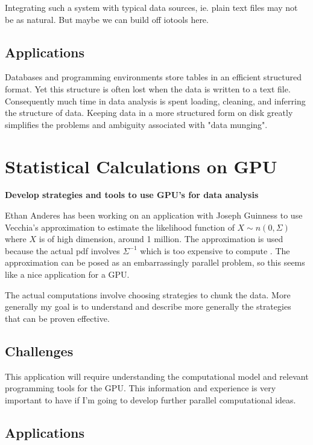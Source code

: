 \documentclass[12pt]{article}
\begin{document}
Integrating such a system with typical data sources, ie. plain text files may
not be as natural. But maybe we can build off iotools here.

\subsection{Applications}

Databases and programming environments store tables in an efficient
structured format. Yet this structure is often lost when the data is
written to a text file. Consequently much time in data analysis is
spent loading, cleaning, and inferring the structure of data. Keeping data
in a more structured form on disk greatly simplifies the problems and
ambiguity associated with "data munging".


\section{Statistical Calculations on GPU}

\textbf{Develop strategies and tools to use GPU's for data analysis}

Ethan Anderes has been working on an application with Joseph Guinness to
use Vecchia's approximation to estimate the likelihood function of $X \sim
n(0, \Sigma)$ where $X$ is of high dimension, around 1 million. The
approximation is used because the actual pdf involves $\Sigma^{-1}$ which
is too expensive to compute \cite{guinness2016permutation}.  The
approximation can be posed as an embarrassingly parallel problem, so this
seems like a nice application for a GPU.

The actual computations involve choosing strategies to chunk the data. More
generally my goal is to understand and describe more generally the
strategies that can be proven effective.

\subsection{Challenges}

This application will require understanding the computational model and
relevant programming tools for the GPU. This information and experience is
very important to have if I'm going to develop further parallel
computational ideas.

\subsection{Applications}
\end{document}
